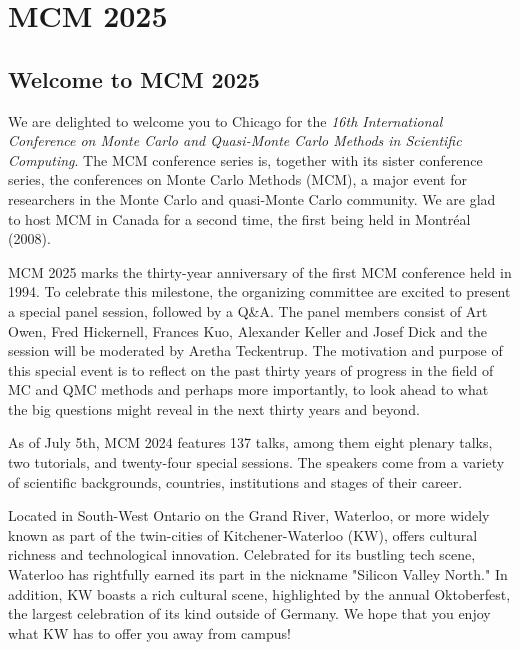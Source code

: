 \chapter{MCM 2025}


\section{Welcome to MCM 2025}

We are delighted to welcome you to Chicago for the \emph{16th International Conference on Monte Carlo and Quasi-Monte Carlo Methods in Scientific Computing}. The MCM conference series is, together with its sister conference series, the conferences on Monte Carlo Methods (MCM), a major event for researchers in the Monte Carlo and quasi-Monte Carlo community. We are glad to host MCM in Canada for a second time, the first being held in Montr\'{e}al (2008).


MCM 2025 marks the thirty-year anniversary of the first MCM conference held in 1994. To celebrate this milestone, the organizing committee are excited to present a special panel session, followed by a Q\&A. The panel members consist of Art Owen, Fred Hickernell, Frances Kuo, Alexander Keller and Josef Dick and the session will be moderated by Aretha Teckentrup. The motivation and purpose of this special event is to reflect on the past thirty years of progress in the field of MC and QMC methods and perhaps more importantly, to look ahead to what the big questions might reveal in the next thirty years and beyond.

As of July 5th, MCM 2024 features 137 talks, 
among them eight plenary talks, two tutorials, and twenty-four special sessions. 
The speakers come from a variety of scientific backgrounds, countries, institutions and stages of their career. 

Located in South-West Ontario on the Grand River, Waterloo, or more widely known as part of the twin-cities of Kitchener-Waterloo (KW), offers cultural richness and technological innovation. Celebrated for its bustling tech scene, Waterloo has rightfully earned its part in the nickname "Silicon Valley North." In addition, KW boasts a rich cultural scene, highlighted by the annual Oktoberfest, the largest celebration of its kind outside of Germany. We hope that you enjoy what KW has to offer you away from campus!

